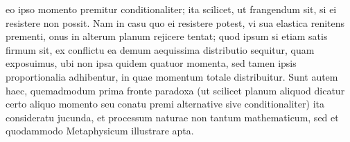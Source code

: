 eo ipso momento premitur %
%
%
conditionaliter; ita scilicet, ut frangendum sit, si ei resistere non possit. 
Nam in casu quo ei resistere potest, vi sua elastica renitens prementi, 
onus in alterum planum rejicere tentat; quod ipsum si etiam satis firmum sit, ex conflictu ea demum aequissima distributio sequitur, quam exposuimus, ubi non ipsa quidem quatuor momenta,
 sed tamen ipsis proportionalia adhibentur, in quae momentum totale distribuitur.%
%
\pend
\pstart
Sunt autem haec, quemadmodum prima fronte paradoxa 
(ut scilicet planum aliquod dicatur certo aliquo momento seu conatu premi alternative sive conditionaliter)
ita consideratu jucunda, et processum naturae non tantum mathematicum, sed et quodammodo Metaphysicum illustrare apta.%
\pend
